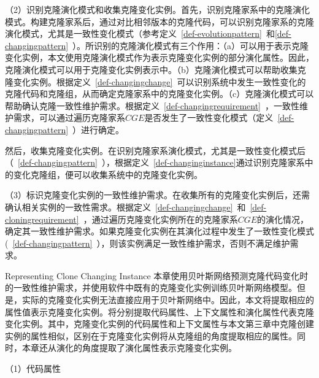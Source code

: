 （2）识别克隆演化模式和收集克隆变化实例。首先，识别克隆家系中的克隆演化模式。构建克隆家系后，通过对比相邻版本的克隆代码，可以识别克隆家系的克隆演化模式，尤其是一致性变化模式（参考定义~\ref{def-evolutionpattern}~和\ref{def-changingpattern}~）。所识别的克隆演化模式有三个作用：（a）可以用于表示克隆变化实例，本文使用克隆演化模式作为表示克隆变化实例的部分演化属性。因此，克隆演化模式可以用于克隆变化实例表示中。（b）克隆演化模式可以帮助收集克隆变化实例。根据定义~\ref{def-changingchange}~可以识别系统中发生一致性变化的克隆代码和克隆组，从而确定克隆家系中的克隆变化实例。（c）克隆演化模式可以帮助确认克隆一致性维护需求。根据定义~\ref{def-changingrequirement}~，一致性维护需求，可以通过遍历克隆家系$CGE$是否发生了一致性变化模式（定义~\ref{def-changingpattern}~）进行确定。

然后，收集克隆变化实例。在识别克隆家系演化模式，尤其是一致性变化模式后（~\ref{def-changingpattern}~），根据定义~\ref{def-changinginstance}通过识别克隆家系中的变化克隆组，便可以收集系统中的克隆变化实例。

（3）标识克隆变化实例的一致性维护需求。在收集所有的克隆变化实例后，还需确认相关实例的一致性需求。根据定义~\ref{def-changingchange}~和~\ref{def-cloningrequirement}~，通过遍历克隆变化实例所在的克隆家系$CGE$的演化情况，确定其一致性维护需求。如果克隆变化实例在其演化过程中发生了一致性变化模式(~\ref{def-changingpattern}~），则该实例满足一致性维护需求，否则不满足维护需求。

{Representing Clone Changing Instance}
\label{lab-changingattribute}
本章使用贝叶斯网络预测克隆代码变化时的一致性维护需求，并使用软件中既有的克隆变化实例训练贝叶斯网络模型。但是，实际的克隆变化实例无法直接应用于贝叶斯网络中。因此，本文将提取相应的属性值表示克隆变化实例。将分别提取代码属性、上下文属性和演化属性代表克隆变化实例。其中，克隆变化实例的代码属性和上下文属性与本文第三章中克隆创建实例的属性相似，区别在于克隆变化实例将从克隆组的角度提取相应的属性。同时，本章还从演化的角度提取了演化属性表示克隆变化实例。



（1）代码属性


